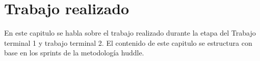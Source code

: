 \chapter{Trabajo realizado}
En este capitulo se habla sobre el trabajo realizado durante la etapa del Trabajo terminal 1 y trabajo terminal 2. El contenido de este capitulo se estructura con base en los sprints de la metodología huddle.


